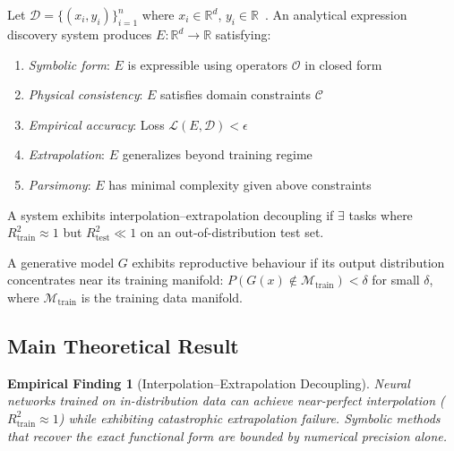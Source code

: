 \documentclass[twoside,11pt]{article}
\newcommand{\Rtrain}{R^{2}_{\mathrm{train}}}
\newcommand{\Rtest}{R^{2}_{\mathrm{test}}}
\newtheorem{finding}{Empirical Finding}
\begin{document}
\begin{definition}
Let $\mathcal{D} = \{(x_i, y_i)\}_{i=1}^n$ where $x_i \in \mathbb{R}^d$, $y_i \in \mathbb{R}$~\citep{udrescu2020ai}. An analytical expression discovery system produces $E: \mathbb{R}^d \to \mathbb{R}$ satisfying:
\begin{enumerate}
  \item \textit{Symbolic form}: $E$ is expressible using operators $\mathcal{O}$ in closed form
  \item \textit{Physical consistency}: $E$ satisfies domain constraints $\mathcal{C}$
  \item \textit{Empirical accuracy}: Loss $\mathcal{L}(E, \mathcal{D}) < \epsilon$
  \item \textit{Extrapolation}: $E$ generalizes beyond training regime
  \item \textit{Parsimony}: $E$ has minimal complexity given above constraints
\end{enumerate}
\end{definition}

\begin{definition}
\label{def:decoupling}
A system exhibits interpolation--extrapolation decoupling if $\exists$ tasks where $\Rtrain \approx 1$ but $\Rtest \ll 1$ on an out-of-distribution test set.
\end{definition}

\begin{definition}
\label{def:reproductive}
A generative model $G$ exhibits reproductive behaviour if its output distribution concentrates near its training manifold: $P(G(x) \notin \mathcal{M}_{\text{train}}) < \delta$ for small $\delta$, where $\mathcal{M}_{\text{train}}$ is the training data manifold.
\end{definition}

\subsection{Main Theoretical Result}\label{subsec:main-theoretical-result}
\label{sec:theory_main}

\begin{finding}[Interpolation--Extrapolation Decoupling]
\label{prop:interp_extrap_decoupling}
Neural networks trained on in-distribution data can achieve near-perfect interpolation ($\Rtrain \approx 1$) while exhibiting catastrophic extrapolation failure. Symbolic methods that recover the exact functional form are bounded by numerical precision alone.
\end{finding}
\end{document}
